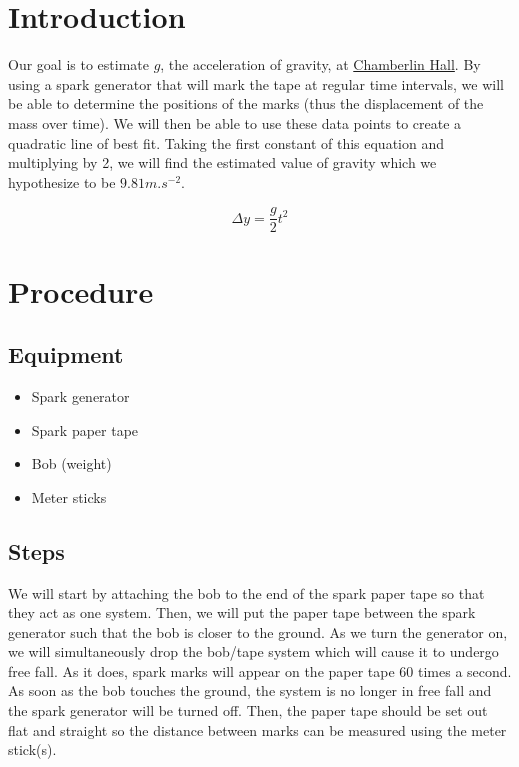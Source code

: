 \documentclass[11pt]{article}
\begin{document}
\begin{multicols}{2}

\section{Introduction}
Our goal is to estimate $g$, the acceleration of gravity, at \href{https://en.wikipedia.org/wiki/Chamberlin_Hall}{Chamberlin Hall}. By using a spark generator that will mark the tape at regular time intervals, we will be able to determine the positions of the marks (thus the displacement of the mass over time). We will then be able to use these data points to create a quadratic line of best fit. Taking the first constant of this equation and multiplying by 2, we will find the estimated value of gravity which we hypothesize to be $9.81 \si{m.s^{-2}}$. 

\begin{equation}
    \Delta y = \frac{g}{2}t^2
    \label{eq:free-fall}
\end{equation}


\section{Procedure}
\subsection{Equipment}
\begin{itemize}[noitemsep,topsep=0pt,parsep=0pt,partopsep=0pt]
    \item Spark generator
    \item Spark paper tape
    \item Bob (weight)
    \item Meter sticks
\end{itemize}

\subsection{Steps}
We will start by attaching the bob to the end of the spark paper tape so that they act as one system. Then, we will put the paper tape between the spark generator such that the bob is closer to the ground. As we turn the generator on, we will simultaneously drop the bob/tape system which will cause it to undergo free fall. As it does, spark marks will appear on the paper tape 60 times a second. As soon as the bob touches the ground, the system is no longer in free fall and the spark generator will be turned off. Then, the paper tape should be set out flat and straight so the distance between marks can be measured using the meter stick(s).



\end{multicols}
\end{document}
